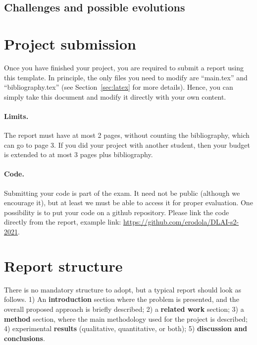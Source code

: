 \documentclass{article}
\begin{document}
	
	\subsection{Challenges and possible evolutions}

\section*{Project submission}

Once you have finished your project, you are required to submit a report using this template. In principle, the only files you need to modify are ``main.tex'' and ``bibliography.tex'' (see Section~\ref{sec:latex} for more details). Hence, you can simply take this document and modify it directly with your own content.

\paragraph*{Limits.}
The report must have at most 2 pages, without counting the bibliography, which can go to page 3. If you did your project with another student, then your budget is extended to at most 3 pages plus bibliography.

\paragraph*{Code.} 
Submitting your code is part of the exam. It need not be public (although we encourage it), but at least we must be able to access it for proper evaluation. One possibility is to put your code on a github repository. Please link the code directly from the report, example link: \url{https://github.com/erodola/DLAI-s2-2021}.

\section*{Report structure}

There is no mandatory structure to adopt, but a typical report should look as follows. 1) An \textbf{introduction} section where the problem is presented, and the overall proposed approach is briefly described; 2) a \textbf{related work} section; 3) a \textbf{method} section, where the main methodology used for the project is described; 4) experimental \textbf{results} (qualitative, quantitative, or both); 5) \textbf{discussion and conclusions}.
\end{document}
